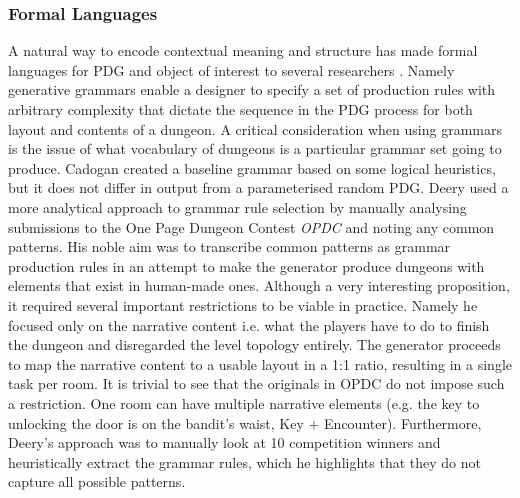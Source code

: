 \documentclass{UoYCSproject}
\begin{document}
\subsubsection{Formal Languages}
\label{subsub:FL}
A natural way to encode contextual meaning and structure has made formal languages for PDG and object of interest to several researchers \parencite{DormansMS,Cadogan,Deery}. Namely generative grammars enable a designer to specify a set of production rules with arbitrary complexity that dictate the sequence in the PDG process for both layout and contents of a dungeon. A critical consideration when using grammars is the issue of what vocabulary of dungeons is a particular grammar set going to produce. Cadogan \parencite{Cadogan} created a baseline grammar based on some logical heuristics, but it does not differ in output from a parameterised random PDG. Deery used a more analytical approach to grammar rule selection by manually analysing submissions to the One Page Dungeon Contest \textit{OPDC} \parencite{OPDC} and noting any common patterns. His noble aim was to transcribe common patterns as grammar production rules in an attempt to make the generator produce dungeons with elements that exist in human-made ones. Although a very interesting proposition, it required several important restrictions to be viable in practice. Namely he focused only on the narrative content i.e. what the players have to do to finish the dungeon and disregarded the level topology entirely. The generator proceeds to map the narrative content to a usable layout in a 1:1 ratio, resulting in a single task per room. It is trivial to see that the originals in OPDC do not impose such a restriction. One room can have multiple narrative elements (e.g. the key to unlocking the door is on the bandit’s waist, Key + Encounter). Furthermore, Deery’s approach was to manually look at 10 competition winners and heuristically extract the grammar rules, which he highlights that they do not capture all possible patterns.

\end{document}
